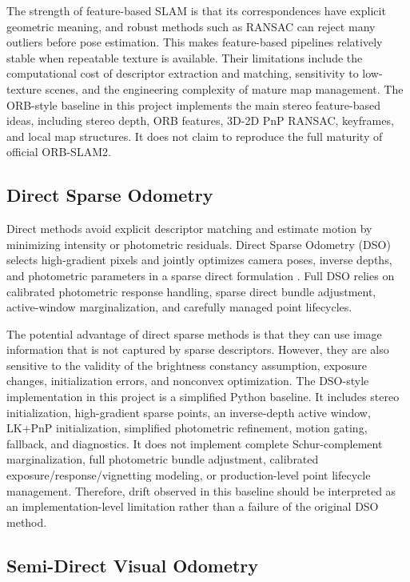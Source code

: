 \documentclass[11pt,a4paper]{article}
\begin{document}
The strength of feature-based SLAM is that its correspondences have explicit geometric meaning, and robust methods such as RANSAC can reject many outliers before pose estimation. This makes feature-based pipelines relatively stable when repeatable texture is available. Their limitations include the computational cost of descriptor extraction and matching, sensitivity to low-texture scenes, and the engineering complexity of mature map management. The ORB-style baseline in this project implements the main stereo feature-based ideas, including stereo depth, ORB features, 3D-2D PnP RANSAC, keyframes, and local map structures. It does not claim to reproduce the full maturity of official ORB-SLAM2.

\subsection{Direct Sparse Odometry}

Direct methods avoid explicit descriptor matching and estimate motion by minimizing intensity or photometric residuals. Direct Sparse Odometry (DSO) selects high-gradient pixels and jointly optimizes camera poses, inverse depths, and photometric parameters in a sparse direct formulation \cite{engel2018dso}. Full DSO relies on calibrated photometric response handling, sparse direct bundle adjustment, active-window marginalization, and carefully managed point lifecycles.

The potential advantage of direct sparse methods is that they can use image information that is not captured by sparse descriptors. However, they are also sensitive to the validity of the brightness constancy assumption, exposure changes, initialization errors, and nonconvex optimization. The DSO-style implementation in this project is a simplified Python baseline. It includes stereo initialization, high-gradient sparse points, an inverse-depth active window, LK+PnP initialization, simplified photometric refinement, motion gating, fallback, and diagnostics. It does not implement complete Schur-complement marginalization, full photometric bundle adjustment, calibrated exposure/response/vignetting modeling, or production-level point lifecycle management. Therefore, drift observed in this baseline should be interpreted as an implementation-level limitation rather than a failure of the original DSO method.

\subsection{Semi-Direct Visual Odometry}
\end{document}
